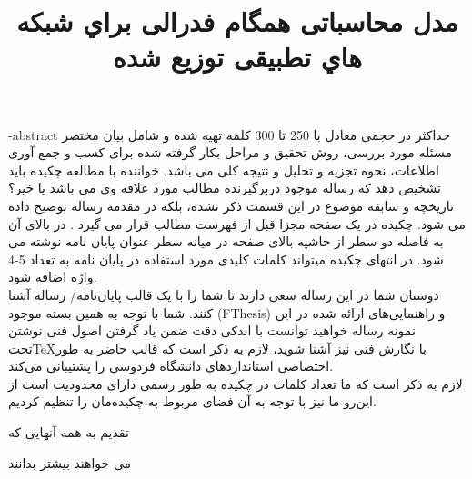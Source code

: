 \KashidaOff
\subject{نرم افزار}

\title{مدل محاسباتی همگام فدرالی براي شبکه هاي تطبیقی توزیع شده}
\fa-abstract{
حداکثر در حجمی معادل با 250 تا 300 کلمه تهيه شده و شامل بيان مختصر مسئله مورد بررسی، روش تحقيق و مراحل بکار گرفته شده برای کسب و جمع آوری اطلاعات، نحوه تجزيه و تحليل و نتيجه کلی می باشد. خواننده با مطالعه چکيده بايد تشخيص دهد که رساله موجود دربرگيرنده مطالب مورد علاقه وی می باشد يا خير؟ تاريخچه و سابقه موضوع در اين قسمت ذکر نشده، بلکه در مقدمه رساله توضيح داده می شود. چکيده در يک صفحه مجزا قبل از فهرست مطالب قرار می گيرد . در بالای آن به فاصله دو سطر از حاشيه بالای صفحه در ميانه سطر عنوان پايان نامه نوشته می شود. در انتهای چکيده ميتواند کلمات کليدی مورد استفاده در پايان نامه به تعداد 5-4 واژه اضافه شود. \\
دوستان شما در این رساله سعی دارند تا شما را با یک قالب پایان‌نامه/ رساله آشنا کنند. شما با توجه به همین بسته موجود (FThesis) و راهنمایی‌های ارائه شده در این نمونه رساله خواهید توانست با اندکی دقت ضمن یاد گرفتن اصول فنی نوشتن تحت\TeX با نگارش فنی نیز آشنا شوید، لازم به ذکر است که قالب حاضر به طور اختصاصی استانداردهای دانشگاه فردوسی را پشتیبانی می‌کند. \\
لازم به ذکر است که ما تعداد کلمات در چکیده به طور رسمی دارای محدودیت است از این‌رو ما نیز با توجه به آن فضای مربوط به چکیده‌مان را تنظیم کردیم.
}
\ftitle
\begin{acknowledgementpage}

\vspace{4cm}

{\nastaliq
{\LARGE
 تقدیم به همه آنهایی که 
\vspace{1.5cm}

\hspace{3cm}
می خواهند بیشتر بدانند
}}
\end{acknowledgementpage}
